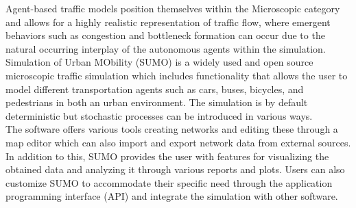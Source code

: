 Agent-based traffic models position themselves within the Microscopic category and allows for a highly realistic representation of traffic flow, where emergent behaviors such as congestion and bottleneck formation can occur due to the natural occurring interplay of the autonomous agents within the simulation. \\

Simulation of Urban MObility (SUMO) is a widely used and open source microscopic traffic simulation which includes functionality that allows the user to model different transportation agents such as cars, buses, bicycles, and pedestrians in both an urban environment. The simulation is by default deterministic but stochastic processes can be introduced in various ways. \\

The software offers various tools creating networks and editing these through a map editor which can also import and export network data from external sources. In addition to this, SUMO provides the user with features for visualizing the obtained data and analyzing it through various reports and plots. Users can also customize SUMO to accommodate their specific need through the application programming interface (API) and integrate the simulation with other software. \\ 
